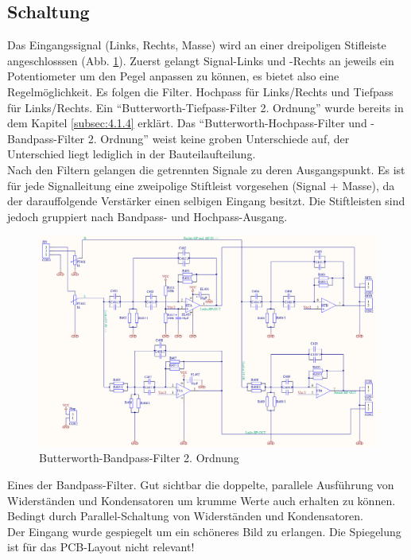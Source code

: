 \subsection{Schaltung}\label{subsec:4.2.4}

Das Eingangssignal (Links, Rechts, Masse) wird an einer dreipoligen Stifleiste angeschlosssen (Abb. \ref{fig:4.2.4.1}). Zuerst gelangt Signal-Links und -Rechts an jeweils ein Potentiometer um den Pegel anpassen zu können, es bietet also eine Regelmöglichkeit. Es folgen die Filter. Hochpass für Links/Rechts und Tiefpass für Links/Rechts. Ein \enquote{Butterworth-Tiefpass-Filter 2. Ordnung} wurde bereits in dem Kapitel \ref{subsec:4.1.4} erklärt. Das \enquote{Butterworth-Hochpass-Filter und -Bandpass-Filter 2. Ordnung} weist keine groben Unterschiede auf, der Unterschied liegt lediglich in der Bauteilaufteilung.\\
Nach den Filtern gelangen die getrennten Signale zu deren Ausgangspunkt. Es ist für jede Signalleitung eine zweipolige Stiftleist vorgesehen (Signal + Masse), da der darauffolgende Verstärker einen selbigen Eingang besitzt. Die Stiftleisten sind jedoch gruppiert nach Bandpass- und Hochpass-Ausgang.\\
\begin{figure} [H]
	\centering	
	\includegraphics[width=1\textwidth]{img/Print4/4_TTuHTWeiche-Schematic.PNG}
	\caption{Butterworth-Bandpass-Filter 2. Ordnung}
	\label {fig:4.2.4.1}
\end{figure}
Eines der Bandpass-Filter. Gut sichtbar die doppelte, parallele Ausführung von Widerständen und Kondensatoren um krumme Werte auch erhalten zu können. Bedingt durch Parallel-Schaltung von Widerständen und Kondensatoren.\\ 
Der Eingang wurde gespiegelt um ein schöneres Bild zu erlangen. Die Spiegelung ist für das PCB-Layout nicht relevant!\\
